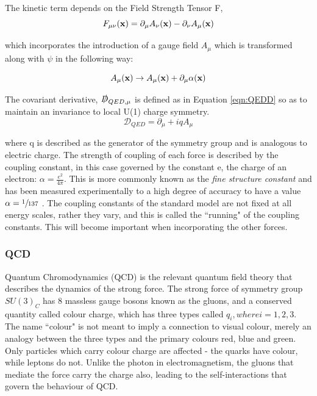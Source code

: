 The kinetic term depends on the Field Strength Tensor F, 
\begin{equation}
F_{\mu \nu} (\mathbf{x}) = \partial_{\mu} A_{\nu}(\mathbf{x}) -   \partial_{\nu} A_{\mu}(\mathbf{x}) 
\end{equation}

which incorporates the introduction of a gauge field $A_{\mu}$ which is transformed along with $\psi$ in the following way:

\begin{equation}
A_{\mu}(\mathbf{x}) \rightarrow A_{\mu}(\mathbf{x}) + \partial_{\mu} \alpha(\mathbf{x})
\label{AQED}
\end{equation}

The  covariant derivative, $\slashed{D}_{QED,\mu}$ is defined as in Equation \ref{eqn:QEDD} so as to maintain an invariance to local U(1) charge symmetry. 
\begin{equation}
\mathcal{D}_{QED} = \partial_{\mu} + iqA_{\mu}
\label{eqn:QEDD}
\end{equation}


where q is described as the generator of the symmetry group and is analogous to electric charge. The strength of coupling of each force is described by the coupling constant, in this case governed by the constant e, the charge of an electron: $\alpha = \frac{e^{2}}{4\pi}$. This is more commonly known as the \textit{fine structure constant} and has been measured experimentally to a high degree of accuracy to have a value $\alpha = \sfrac{1}{137}$ \cite{qedalpha}. The coupling constants of the standard model are not fixed at all energy scales, rather they vary, and this is called the ``running" of the coupling constants. This will become important when incorporating the other forces. 

\subsubsection{QCD}

Quantum Chromodynamics (QCD) is the relevant quantum field theory that describes the dynamics of the strong force. The strong force of symmetry group $SU(3)_{C}$ has 8 massless gauge bosons known as the gluons, and a conserved quantity called colour charge, which has three types called $q_{i}, where i=1, 2, 3$. The name ``colour" is not meant to imply a connection to visual colour, merely an analogy between the three types and the primary colours red, blue and green. Only particles which carry colour charge are affected - the quarks have colour, while leptons do not. Unlike the photon in electromagnetism, the gluons that mediate the force carry the charge also, leading to the self-interactions that govern the behaviour of QCD. 

